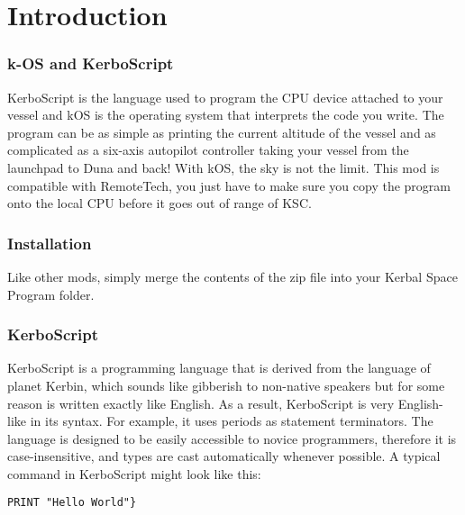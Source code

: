 \part{Introduction}
	\section*{k-OS and KerboScript}
		KerboScript is the language used to program the CPU device attached to your vessel and kOS is the operating system that interprets the code you write. The program can be as simple as printing the current altitude of the vessel and as complicated as a six-axis autopilot controller taking your vessel from the launchpad to Duna and back! With kOS, the sky is not the limit.
		This mod is compatible with RemoteTech, you just have to make sure you copy the program onto the local CPU before it goes out of range of KSC.
	\section*{Installation}
		Like other mods, simply merge the contents of the zip file into your Kerbal Space Program folder.
	\section*{KerboScript}
		KerboScript is a programming language that is derived from the language of planet Kerbin, which sounds like gibberish to non-native speakers but for some reason is written exactly like English. As a result, KerboScript is very English-like in its syntax. For example, it uses periods as statement terminators.
		The language is designed to be easily accessible to novice programmers, therefore it is case-insensitive, and types are cast automatically whenever possible.
		A typical command in KerboScript might look like this:
			
			\begin{lstlisting}[frame=single,language=XML]
			PRINT "Hello World"}
			\end{lstlisting} 